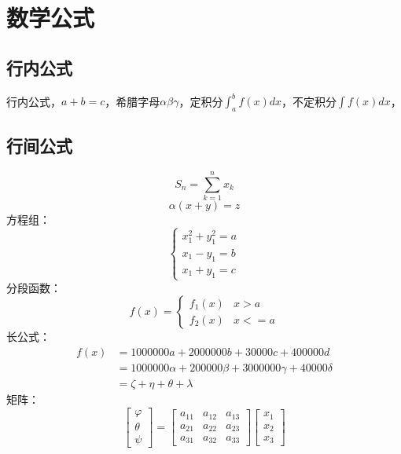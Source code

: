 \documentclass[a4paper,AutoFakeBold={2.7}]{ctexart} %
\begin{document}
\section{数学公式}
\subsection{行内公式}
行内公式，$a+b=c$，希腊字母$\alpha\beta\gamma$，定积分$\int_{a}^{b} f(x)dx$，不定积分$\int f(x)dx$，
\subsection{行间公式}
\begin{equation}
	S_{n}=\sum_{k=1}^{n} x_{k} \label{(1)}
\end{equation}
\begin{equation}
	\alpha\left( x+y\right) =z
\end{equation}
方程组：
\begin{equation}
	\begin{cases}
		x_{1}^{2}+y_{1}^2=a\\
		x_{1}-y_{1}=b\\
		x_{1}+y_{1}=c
	\end{cases}
\end{equation}
分段函数：
\begin{equation}
	f(x)=
	\begin{cases}
		f_{1}(x) &x>a\\
		f_{2}(x) &x<=a
	\end{cases}
\end{equation}
长公式：
\begin{equation}
	\begin{split}
		f(x)&=1000000a+2000000b+30000c+400000d\\
		&=1000000\alpha+200000\beta+3000000\gamma+40000\delta\\
		&=\zeta+\eta+\theta+\lambda
	\end{split}
\end{equation}
矩阵：
\begin{equation}
	\left[ 
	\begin{array}{c}
		\varphi\\
		\theta\\
		\psi
	\end{array}\right] =
	\left[
	\begin{array}{ccc}
		a_{11}&a_{12}&a_{13}\\
		a_{21}&a_{22}&a_{23}\\
		a_{31}&a_{32}&a_{33}
	\end{array}\right] 
	\left[\begin{array}{c}
		x_{1}\\
		x_{2}\\
		x_{3} 
	\end{array}\right] 
\end{equation}
\end{document}

